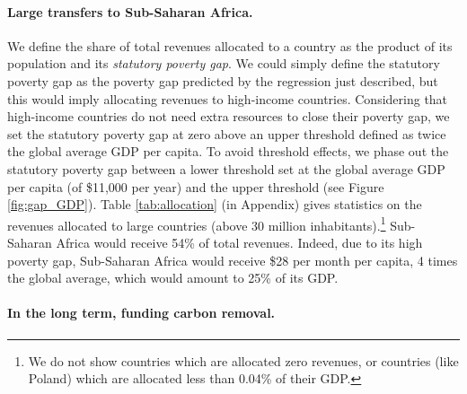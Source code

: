 \documentclass[12pt,english]{article}
\begin{document}
\paragraph{Large transfers to Sub-Saharan Africa.} We define the share of total revenues allocated to a country as the product of its population and its \textit{statutory poverty gap}. We could simply define the statutory poverty gap as the poverty gap predicted by the regression just described, but this would imply allocating revenues to high-income countries. %
Considering that high-income countries do not need extra resources to close their poverty gap, we set the statutory poverty gap at zero above an upper threshold defined as twice the global average GDP per capita. %
To avoid threshold effects, we phase out the statutory poverty gap between a lower threshold set at the global average GDP per capita (of \$11,000 per year) and the upper threshold (see Figure \ref{fig:gap_GDP}). Table \ref{tab:allocation} (in Appendix) gives statistics on the revenues allocated to large countries (above 30 million inhabitants).\footnote{We do not show countries which are allocated zero revenues, or countries (like Poland) which are allocated less than 0.04\% of their GDP.} %
Sub-Saharan Africa would receive 54\% of total revenues.  
Indeed, due to its high poverty gap, Sub-Saharan Africa would receive \$28 per month per capita, 4 times the global average, which would amount to 25\% of its GDP. %

\paragraph{In the long term, funding carbon removal.} 
\end{document}
